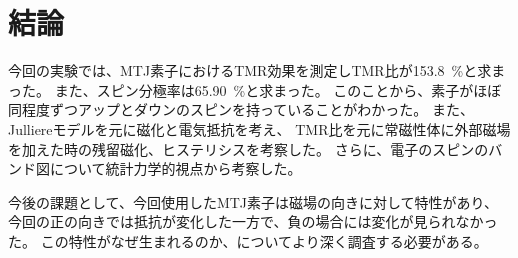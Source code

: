 \documentclass[../../../main]{subfiles}
\begin{document}
\section{結論}
今回の実験では、MTJ素子におけるTMR効果を測定しTMR比が\SI{153.8}{\%}と求まった。
また、スピン分極率は\SI{65.90}{\%}と求まった。
このことから、素子がほぼ同程度ずつアップとダウンのスピンを持っていることがわかった。
また、Julliereモデルを元に磁化と電気抵抗を考え、
TMR比を元に常磁性体に外部磁場を加えた時の残留磁化、ヒステリシスを考察した。
さらに、電子のスピンのバンド図について統計力学的視点から考察した。

今後の課題として、今回使用したMTJ素子は磁場の向きに対して特性があり、
今回の正の向きでは抵抗が変化した一方で、負の場合には変化が見られなかった。
この特性がなぜ生まれるのか、についてより深く調査する必要がある。
\end{document}
